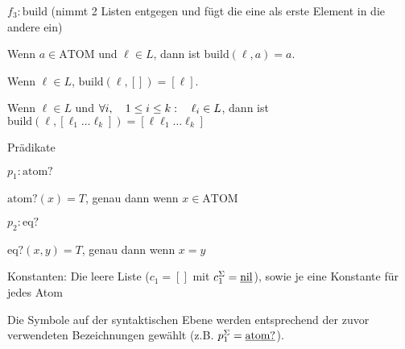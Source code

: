\begin{defn}
\begin{\whichitem}
\begin{\whichenum}
\item $f_3: \text{build}$ (nimmt 2 Listen entgegen und fügt die eine als erste Element in die andere ein)
\begin{\whichitem}
\item Wenn $a \in \text{ATOM}$ und $\ell \in L$, dann ist $\text{build}(\ell,a)=a$.
\item Wenn $\ell \in L$, $\text{build}(\ell,[ ])=[\ell]$.
\item Wenn $\ell \in L$ und $\text{$\forall$} i, \quad 1 \leq i \leq k: \quad \ell_i \in L$, dann ist $\text{build}(\ell,[ \ell_1 \ldots \ell_k ])=[ \ell \ell_1 \ldots \ell_k ]$
\end{\whichitem}
\end{\whichenum}
\item Prädikate
\begin{\whichenum}
\item $p_1: \text{atom?}$
\begin{\whichitem}
\item $\text{atom?}(x)=T$, genau dann wenn $x \in \text{ATOM}$
\end{\whichitem}
\item $p_2: \text{eq?}$
\begin{\whichitem}
\item $\text{eq?}(x,y)=T$, genau dann wenn $x=y$
\end{\whichitem}
\end{\whichenum}
\item Konstanten: Die leere Liste ($c_1=[]$ mit $c_1^\Sigma=\text{\underline{nil}}$), sowie je eine Konstante für jedes Atom
\end{\whichitem}
Die Symbole auf der syntaktischen Ebene werden entsprechend der zuvor verwendeten Bezeichnungen gewählt (z.B. $p_1^{\Sigma}=\text{\underline{atom?}}$).
\end{defn}

